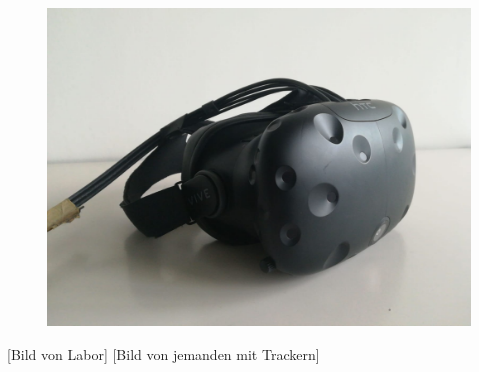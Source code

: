 \begin{figure}[h]
  \includegraphics[scale=0.15]{Bilder/Brille/VIVEHMD.jpeg}
  \label{fig:VIVEHMD}
\end{figure}
[Bild von Labor] [Bild von jemanden mit Trackern]

